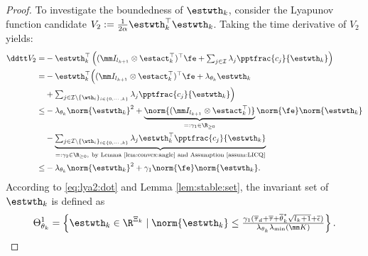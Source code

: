 \documentclass[journal]{IEEEtran}
\begin{document}
\begin{proof}
To investigate the boundedness of $\estwth_k$, consider the Lyapunov function candidate $V_2:=\tfrac{1}{2\alpha}\estwth_k^\top \estwth_k$.
Taking the time derivative of $V_2$ yields:
\begin{equation}
    \begin{aligned}
        \ddtt V_2 
        =& 
        -\estwth_k^\top 
        \left(
            (\mm I_{l_{k+1}}\otimes \estact_k^\top)^\top
            \fe
            +
            \textstyle\sum_{j\in\mathcal{I}}
            \lambda_j 
            \pptfrac{c_j}{\estwth_k}
        \right)
        \\
        =&
        -\estwth_k^\top 
        \Big(
            (\mm I_{l_{k+1}}\otimes \estact_k^\top)^\top
            \fe
            +
            \lambda_{\theta_k}\estwth_k
        \\
        &
            +
            \textstyle\sum_{
                j\in\mathcal{I}\setminus \{\wth_i\}_{i\in\{0,\cdots,k\}}
            }
            \lambda_j 
            \pptfrac{c_j}{\estwth_k}
        \Big)
        \\
        \le&
        -
        \lambda_{\theta_k}\norm{\estwth_k}^2
        +
        \underbrace{
            \norm{(\mm I_{l_{k+1}}\otimes {\estact}_k^\top)}
        }_{=:{\gamma}_1\in\R_{\ge0}}
        \norm{\fe}
        \norm{\estwth_k}
        \\
        &
        -
        \underbrace{
            \textstyle\sum_{
                j\in\mathcal{I}\setminus \{\wth_i\}_{i\in\{0,\cdots,k\}}
            }
            \lambda_j 
            \estwth_k^\top \pptfrac{c_j}{\estwth_k}
        }_{=:{\gamma}_2\in\R_{\ge0},\ \text{by Lemma \ref{lem:convex:angle} and Assumption \ref{assum:LICQ}}}
        \\
        \le&
        -
        \lambda_{\theta_k}\norm{\estwth_k}^2
        +
        {\gamma}_1     
        \norm{\fe}
        \norm{\estwth_k}
        .
    \end{aligned}
    \label{eq:lya2:dot}
\end{equation}
According to \eqref{eq:lya2:dot} and Lemma \ref{lem:stable:set}, the invariant set of $\estwth_k$ is defined as
\begin{equation}
    \Theta_{\theta_k}^{1} 
    = 
    \left\{ 
        \estwth_k \in \R^{\Xi_{k}} 
        \mid 
        \norm{\estwth_k} 
        \le 
        \tfrac{
            {\gamma}_1
            (
                \overline\tau_d
                +
                \overline\tau
                +
                \overline{\theta}^*_k\sqrt{l_{k}+1}
                +
                \overline{\epsilon}
            )
        }{
            \lambda_{\theta_k}\lambda_{\min}(\mm K)
        }
    \right\}
    .
    \label{eq:invariant:c1:wth}
\end{equation}


\end{proof}
\end{document}
